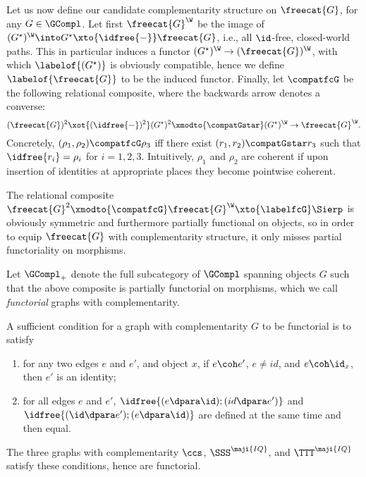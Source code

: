 \documentclass{LMCS}
\renewcommand{\QFI}{\maji{IQ}}
\renewcommand{\LLL}{\QFI}
\renewcommand{\SSSL}{\SSS^{\LLL}}
\renewcommand{\TTTL}{\TTT^{\LLL}}
\theoremstyle{plain}\newtheorem{satz}[thm]{Satz}
\begin{document}
  Let us now define our candidate complementarity structure on $\freecat{G}$,
  for any $G \in \GCompl$.  Let first $\freecat{G}^\W$ be the image of
  $(G^\star)^\W \into G^\star \xto{\idfree{-}} \freecat{G}$, i.e., all
  $\id$-free, closed-world paths.  This in particular induces a
  functor $(G^\star)^\W \to (\freecat{G})^\W$, with which
  $\labelof{(G^\star)}$ is obviously compatible, hence we define
  $\labelof{\freecat{G}}$ to be the induced functor.  Finally, let
  $\compatfcG$ be the following relational composite, where the backwards
  arrow denotes a converse:
  $$(\freecat{G})^2 \xot{(\idfree{-})^2} (G^\star)^2 \xmodto{\compatGstar} (G^\star)^\W \to
  \freecat{G}^\W.$$ Concretely, $(\rho_1,\rho_2) \compatfcG \rho_3$
  iff there exist $(r_1,r_2) \compatGstar r_3$ such that $\idfree{r_i}
  = \rho_i$ for $i = 1,2,3$.  Intuitively, $\rho_1$ and $\rho_2$ are
  coherent if upon insertion of identities at appropriate places they
  become pointwise coherent.  

  The relational composite $\freecat{G}^2 \xmodto{\compatfcG} \freecat{G}^\W \xto{\labelfcG}
  \Sierp$ is obviously symmetric and furthermore partially functional
  on objects, so in order to equip $\freecat{G}$ with complementarity
  structure, it only misses partial functoriality on morphisms.

  \begin{defi}
    Let $\GCompl_+$ denote the full subcategory of $\GCompl$ spanning
    objects $G$ such that the above composite is partially functorial
    on morphisms, which we call \emph{functorial} graphs with
    complementarity.
  \end{defi}

  \begin{exa}
    A sufficient condition for a graph with complementarity $G$ to be
    functorial is to satisfy
     \begin{enumerate}[label=(\roman*)]
     \item for any two edges $e$ and $e'$, and object $x$, if $e \coh
       e'$, $e \neq id$, and $e \coh \id_x$, then $e'$ is an identity;
     \item for all edges $e$ and $e'$, $\idfree{(e \dpara \id) ; (id
         \dpara e')}$ and $\idfree{(\id \dpara e') ; (e \dpara \id)}$
       are defined at the same time and then equal.
     \end{enumerate}    
     The three graphs with complementarity $\ccs$, $\SSSL$, and
     $\TTTL$ satisfy these conditions, hence are functorial.
  \end{exa}
\end{document}
